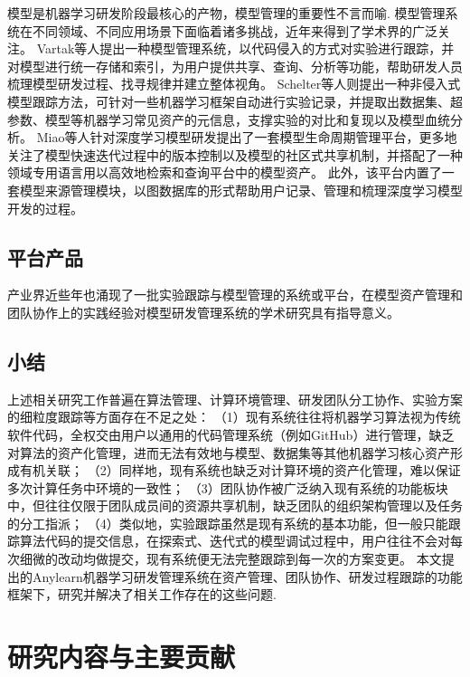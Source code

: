 模型是机器学习研发阶段最核心的产物，模型管理的重要性不言而喻. 模型管理系统在不同领域、不同应用场景下面临着诸多挑战\cite{Sch15, Scu15}，近年来得到了学术界的广泛关注。
Vartak等人\cite{Var16}提出一种模型管理系统，以代码侵入的方式对实验进行跟踪，并对模型进行统一存储和索引，为用户提供共享、查询、分析等功能，帮助研发人员梳理模型研发过程、找寻规律并建立整体视角。
Schelter等人\cite{Sch17}则提出一种非侵入式模型跟踪方法，可针对一些机器学习框架自动进行实验记录，并提取出数据集、超参数、模型等机器学习常见资产的元信息，支撑实验的对比和复现以及模型血统分析。
Miao等人\cite{Mia17}针对深度学习模型研发提出了一套模型生命周期管理平台，更多地关注了模型快速迭代过程中的版本控制以及模型的社区式共享机制，并搭配了一种领域专用语言用以高效地检索和查询平台中的模型资产。
此外，该平台内置了一套模型来源管理模块，以图数据库的形式帮助用户记录、管理和梳理深度学习模型开发的过程。

\subsection{平台产品}

产业界近些年也涌现了一批实验跟踪与模型管理的系统或平台\cite{wandb, neptuneai, huggingface}，在模型资产管理和团队协作上的实践经验对模型研发管理系统的学术研究具有指导意义。

\subsection{小结}

上述相关研究工作普遍在算法管理、计算环境管理、研发团队分工协作、实验方案的细粒度跟踪等方面存在不足之处：
（1）现有系统往往将机器学习算法视为传统软件代码，全权交由用户以通用的代码管理系统（例如GitHub）进行管理，缺乏对算法的资产化管理，进而无法有效地与模型、数据集等其他机器学习核心资产形成有机关联；
（2）同样地，现有系统也缺乏对计算环境的资产化管理，难以保证多次计算任务中环境的一致性；
（3）团队协作被广泛纳入现有系统的功能板块中，但往往仅限于团队成员间的资源共享机制，缺乏团队的组织架构管理以及任务的分工指派；
（4）类似地，实验跟踪虽然是现有系统的基本功能，但一般只能跟踪算法代码的提交信息，在探索式、迭代式的模型调试过程中，用户往往不会对每次细微的改动均做提交，现有系统便无法完整跟踪到每一次的方案变更。
本文提出的Anylearn机器学习研发管理系统在资产管理、团队协作、研发过程跟踪的功能框架下，研究并解决了相关工作存在的这些问题.


%
\section{研究内容与主要贡献}

